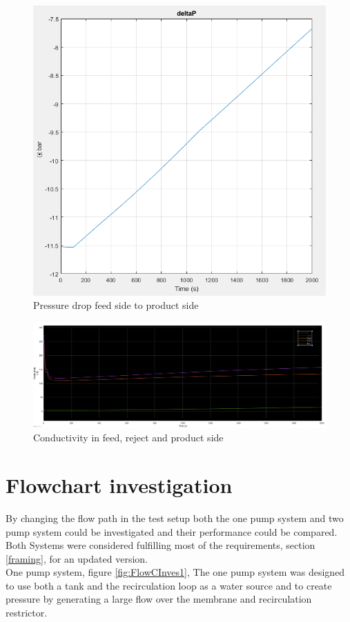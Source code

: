\begin{figure}[h]
  \centering
  \includegraphics[width=0.5\linewidth]{deltap.PNG}
  \caption{Pressure drop feed side to product side}
  \label{fig:deltap}
\end{figure}


\begin{figure}[h]
  \centering
  \includegraphics[width=1.1\linewidth]{cond.PNG}
  \caption{Conductivity in feed, reject and product side}
  \label{fig:cond}
\end{figure}

\newpage


\section{Flowchart investigation}
By changing the flow path in the test setup both the one pump system and two pump system could be investigated and their performance could be compared. Both Systems were considered fulfilling most of the requirements, section \ref{framing}, for an updated version. \\

One pump system, figure \ref{fig:FlowCInves1}, The one pump system was designed to use both a tank and the recirculation loop as a water source and to create pressure by generating a large flow over the membrane and recirculation restrictor. \\


